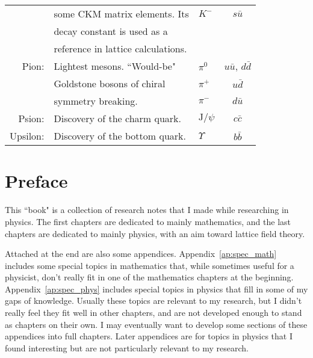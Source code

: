 \documentclass[12pt]{book}
\theoremstyle{definition}
\newenvironment{frontstuff}
  {\centering\chapter*{}}
  {\clearpage}
\begin{document}
\begin{frontstuff}
\begin{tabularx}{\linewidth}{rLlc}
         & some CKM matrix elements. Its 
                                     & $K^-$ &   $s\bar{u}$ \\
         & decay constant is used as a 
                                     &       &              \\
         & reference in lattice calculations.
                                     &       &              
\vspace{2mm}\\
Pion:    & Lightest mesons. ``Would-be"
                                     & $\pi^0$ &   $u\bar{u}$,
                                                   $d\bar{d}$ \\
         & Goldstone bosons of chiral& $\pi^+$ &   $u\bar{d}$ \\
         & symmetry breaking.        & $\pi^-$ &   $d\bar{u}$
\vspace{2mm}\\
Psion:   & Discovery of the charm quark.
         & $\text{J}/\psi$                     &   $c\bar{c}$ 
\vspace{2mm}\\
Upsilon: & Discovery of the bottom quark.
         & $\Upsilon$                          &   $b\bar{b}$ \\
\end{tabularx}
\clearpage

\end{frontstuff} %

\chapter{Preface}
This ``book" is a collection of research notes that I made while researching in
physics. The first chapters are dedicated to mainly mathematics, and the last
chapters are dedicated to mainly physics, with an aim toward lattice field
theory. 

Attached at the end are also some appendices. 
Appendix~\ref{ap:spec_math} includes some special topics in mathematics 
that, while sometimes useful for a physicist, don't really fit in one of 
the mathematics chapters at the beginning. Appendix~\ref{ap:spec_phys} includes
special topics in physics that fill in some of my gaps of knowledge. Usually
these topics are relevant to my research, but I didn't really feel they fit
well in other chapters, and are not developed enough to stand as chapters
on their own. I may eventually want
to develop some sections of these appendices into full chapters.
Later appendices are for topics in physics that I found interesting but are
not particularly relevant to my research.
\end{document}
